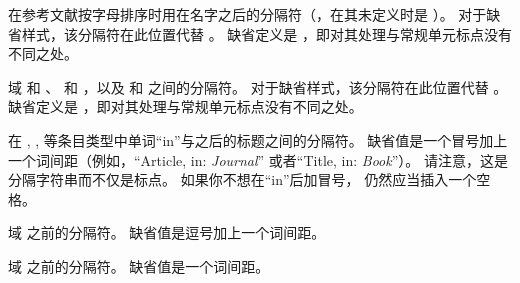\begin{ltxsyntax}
在参考文献按字母排序时用在名字之后的分隔符（，在其未定义时是 ）。
对于缺省样式，该分隔符在此位置代替 。
缺省定义是 ，即对其处理与常规单元标点没有不同之处。

域  和 、 和 ，以及  和  之间的分隔符。
对于缺省样式，该分隔符在此位置代替 。
缺省定义是 ，即对其处理与常规单元标点没有不同之处。

在 , ,  等条目类型中单词“in”与之后的标题之间的分隔符。
缺省值是一个冒号加上一个词间距（例如，“Article, in: \emph{Journal}” 或者“Title, in: \emph{Book}”）。
请注意，这是分隔字符串而不仅是标点。
如果你不想在“in”后加冒号， 仍然应当插入一个空格。

域  之前的分隔符。
缺省值是逗号加上一个词间距。

域  之前的分隔符。
缺省值是一个词间距。


\end{ltxsyntax}
